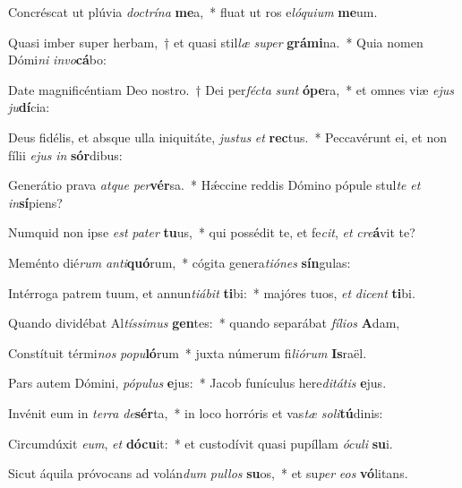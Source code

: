 \item Concréscat ut plúvia \textit{doc}\textit{trí}\textit{na} \textbf{me}a,~* fluat ut ros e\textit{ló}\textit{qui}\textit{um} \textbf{me}um.
\item Quasi imber super herbam,~† et quasi stil\textit{læ} \textit{su}\textit{per} \textbf{grá}\textbf{mi}na.~* Quia nomen Dómi\textit{ni} \textit{in}\textit{vo}\textbf{cá}bo:
\item Date magnificéntiam Deo nostro.~† Dei per\textit{féc}\textit{ta} \textit{sunt} \textbf{ó}\textbf{pe}ra,~* et omnes viæ \textit{e}\textit{jus} \textit{ju}\textbf{dí}cia:
\item Deus fidélis, et absque ulla iniquitáte, \textit{jus}\textit{tus} \textit{et} \textbf{rec}tus.~* Peccavérunt ei, et non fílii \textit{e}\textit{jus} \textit{in} \textbf{sór}dibus:
\item Generátio prava \textit{at}\textit{que} \textit{per}\textbf{vér}sa.~* Hǽccine reddis Dómino pópule stul\textit{te} \textit{et} \textit{in}\textbf{sí}piens?
\item Numquid non ipse \textit{est} \textit{pa}\textit{ter} \textbf{tu}us,~* qui possédit te, et fe\textit{cit}, \textit{et} \textit{cre}\textbf{á}vit te?
\item Meménto dié\textit{rum} \textit{an}\textit{ti}\textbf{quó}rum,~* cógita genera\textit{ti}\textit{ó}\textit{nes} \textbf{sín}gulas:
\item Intérroga patrem tuum, et annun\textit{ti}\textit{á}\textit{bit} \textbf{ti}bi:~* majóres tuos, \textit{et} \textit{di}\textit{cent} \textbf{ti}bi.
\item Quando dividébat Al\textit{tís}\textit{si}\textit{mus} \textbf{gen}tes:~* quando separábat \textit{fí}\textit{li}\textit{os} \textbf{A}dam,
\item Constítuit térmi\textit{nos} \textit{po}\textit{pu}\textbf{ló}rum~* juxta númerum fi\textit{li}\textit{ó}\textit{rum} \textbf{Is}raël.
\item Pars autem Dómini, \textit{pó}\textit{pu}\textit{lus} \textbf{e}jus:~* Jacob funículus here\textit{di}\textit{tá}\textit{tis} \textbf{e}jus.
\item Invénit eum in \textit{ter}\textit{ra} \textit{de}\textbf{sér}ta,~* in loco horróris et vas\textit{tæ} \textit{so}\textit{li}\textbf{tú}dinis:
\item Circumdúxit \textit{e}\textit{um}, \textit{et} \textbf{dó}\textbf{cu}it:~* et custodívit quasi pupíllam \textit{ó}\textit{cu}\textit{li} \textbf{su}i.
\item Sicut áquila próvocans ad volán\textit{dum} \textit{pul}\textit{los} \textbf{su}os,~* et su\textit{per} \textit{e}\textit{os} \textbf{vó}litans.

